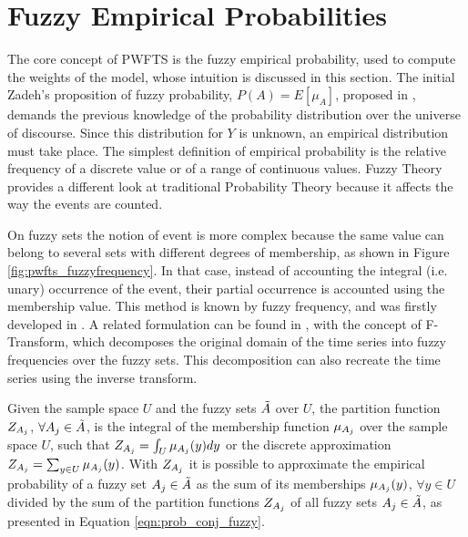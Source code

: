 \section{Fuzzy Empirical Probabilities}
\label{sec:pwfts_empiricalprob}

The core concept of PWFTS is the fuzzy empirical probability, used to compute the weights of the model, whose intuition is discussed in this section. The initial Zadeh's proposition of fuzzy probability, $P(A) = E[\mu_A]$, proposed in \cite{Zadeh1968}, demands the previous knowledge of the probability distribution over the universe of discourse. Since this distribution for $Y$ is unknown, an empirical distribution must take place. The simplest definition of empirical probability is the relative frequency of a discrete value or of a range of continuous values. Fuzzy Theory provides a different look at traditional Probability Theory because it affects the way the events are counted. 

On fuzzy sets the notion of event is more complex because the same value can belong to several sets with different degrees of membership, as shown in Figure \ref{fig:pwfts_fuzzyfrequency}. In that case, instead of accounting the integral (i.e. unary) occurrence of the event, their partial occurrence is accounted using the membership value. This method is known by fuzzy frequency, and was firstly  developed in \cite{Luo2000}. A related formulation can be found in \cite{Perfilieva2006}, with the concept of F-Transform, which decomposes the original domain of the time series into fuzzy frequencies over the fuzzy sets. This decomposition can also recreate the time series using the inverse transform. 

Given the sample space $U$ and the fuzzy sets $\tilde{A}$ over $U$, the partition function $Z_{A_j}$, $\forall A_j \in \tilde{A}$, is the integral of the membership function $\mu_{A_j}$ over the sample space $U$, such that $Z_{A_j} = \int_U \mu_{A_j}(y) dy$ or the discrete approximation $Z_{A_j} = \sum_{y \in U} \mu_{A_j}(y)$. With $Z_{A_j}$ it is possible to approximate the empirical probability of a fuzzy set $A_j \in \tilde{A}$ as the sum of its memberships $\mu_{A_j}(y)$, $\forall y \in U$ divided by the sum of the partition functions $Z_{A_j}$ of all fuzzy sets $A_j \in \tilde{A}$, as presented in Equation \eqref{eqn:prob_conj_fuzzy}. 

